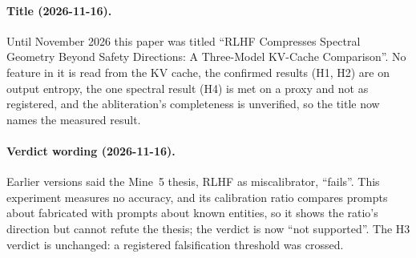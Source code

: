 \documentclass[11pt,a4paper]{article}
\begin{document}
\paragraph{Title (2026-11-16).}
Until November 2026 this paper was titled ``RLHF Compresses Spectral
Geometry Beyond Safety Directions: A Three-Model KV-Cache Comparison''.
No feature in it is read from the KV cache, the confirmed results (H1,
H2) are on output entropy, the one spectral result (H4) is met on a
proxy and not as registered, and the abliteration's completeness is
unverified, so the title now names the measured result.

\paragraph{Verdict wording (2026-11-16).}
Earlier versions said the Mine~5 thesis, RLHF as miscalibrator,
``fails''. This experiment measures no accuracy, and its calibration
ratio compares prompts about fabricated with prompts about known
entities, so it shows the ratio's direction but cannot refute the
thesis; the verdict is now ``not supported''. The H3 verdict is
unchanged: a registered falsification threshold was crossed.



\end{document}
